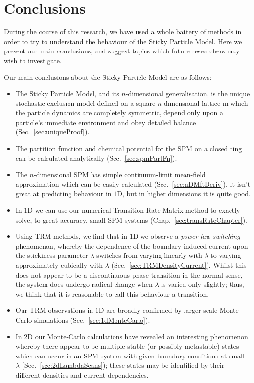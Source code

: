 \chapter{Conclusions}
During the course of this research, we have used a whole battery of methods in order to try to understand
the behaviour of the Sticky Particle Model. Here we present our main conclusions, and suggest topics which
future researchers may wish to investigate.

Our main conclusions about the Sticky Particle Model are as follows:
\begin{itemize}
 \item The Sticky Particle Model, and its $n$-dimensional generalisation, is the unique stochastic exclusion 
 model defined on a square $n$-dimensional lattice in which the particle dynamics are completely symmetric,
 depend only upon a particle's immediate environment and obey detailed balance (Sec.~\ref{sec:uniqueProof}).
 \item The partition function and chemical potential for the SPM on a closed ring can be calculated analytically (Sec.~\ref{sec:spmPartFn}).
 \item The $n$-dimensional SPM has simple continuum-limit mean-field approximation which can be easily
 calculated (Sec.~\ref{sec:nDMftDeriv}). It isn't great at predicting behaviour in $1$D, but in higher dimensions
 it is quite good.
 \item In $1$D we can use our numerical Transition Rate Matrix method to exactly solve, to great accuracy,
 small SPM systems (Chap.~\ref{sec:transRateChapter}).
 \item Using TRM methods, we find that in $1$D we observe a \textit{power-law switching} phenomenon, whereby the dependence of the boundary-induced current upon the stickiness parameter $\lambda$ switches from
 varying linearly with $\lambda$ to varying approximately cubically with $\lambda$ 
 (Sec.~\ref{sec:TRMDensityCurrent}). Whilst this does not appear to be a discontinuous phase transition in the
 normal sense, the system does undergo radical change when $\lambda$ is varied only slightly; thus, we think that it is reasonable to call this behaviour a transition.
 \item Our TRM observations in $1$D are broadly confirmed by larger-scale Monte-Carlo simulations 
 (Sec.~\ref{sec:1dMonteCarlo}).
 \item In $2$D our Monte-Carlo calculations have revealed an interesting phenomenon whereby there appear
 to be multiple stable (or possibly metastable) states which can occur in an SPM system with given boundary
 conditions at small $\lambda$ (Sec.~\ref{sec:2dLambdaScans}); these states may be identified by their 
 different densities and current dependencies.
\end{itemize}

